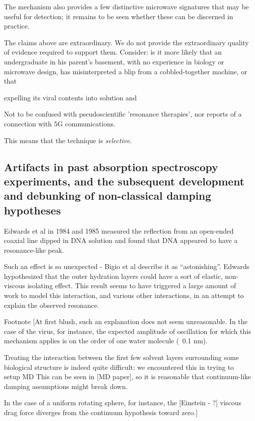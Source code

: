 \documentclass[paper.tex]{subfiles}
\begin{document}
The mechanism also provides a few distinctive microwave signatures that may be useful for detection; it remains to be seen whether these can be discerned in practice.

The claims above are extraordinary. We do not provide the extraordinary quality of evidence required to support them. Consider: is it more likely that an undergraduate in his parent's basement, with no experience in biology or microwave design, has misinterpreted a blip from a cobbled-together machine, or that 

expelling its viral contents into solution and 

Not to be confused with pseudoscientific 'resonance therapies', nor reports of a connection with 5G communications.

This means that the technique is {\it selective}.



\subsection{Artifacts in past absorption spectroscopy experiments, and the subsequent development and debunking of non-classical damping hypotheses}

Edwards et al in 1984 and 1985 measured the reflection from an open-ended coaxial line dipped in DNA solution and found that DNA appeared to have a resonance-like peak.

Such an effect is so unexpected - Bigio et al describe it as “astonishing”. Edwards hypothesized that the outer hydration layers could have a sort of elastic, non-viscous isolating effect. This result seems to have triggered a large amount of work to model this interaction, and various other interactions, in an attempt to explain the observed resonance.

Footnote [At first blush, such an explanation does not seem unreasonable. In the case of the virus, for instance, the expected amplitude of oscillation for which this mechanism applies is on the order of one water molecule (~0.1 nm).

Treating the interaction between the first few solvent layers surrounding some biological structure is indeed quite difficult; we encountered this in trying to setup MD This can be seen in [MD paper], so it is reasonable that continuum-like damping assumptions might break down. 

In the case of a uniform rotating sphere, for instance, the [Einstein - ?] viscous drag force diverges from the continuum hypothesis toward zero.]
\end{document}
